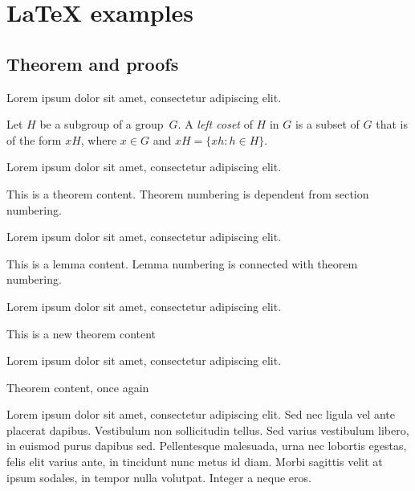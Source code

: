 \chapter{LaTeX examples}

\section{Theorem and proofs}
Lorem ipsum dolor sit amet, consectetur adipiscing elit.

\begin{defi}
    Let $H$ be a subgroup of a group~$G$.  A \emph{left coset}
    of $H$ in $G$ is a subset of $G$ that is of the form $xH$,
    where $x \in G$ and $xH = \{ xh : h \in H \}$.
\end{defi}

Lorem ipsum dolor sit amet, consectetur adipiscing elit.

\begin{theorem}
    This is a theorem content. Theorem numbering is dependent from section numbering.
\end{theorem}

Lorem ipsum dolor sit amet, consectetur adipiscing elit.

\begin{lemma}
    This is a lemma content. Lemma numbering is connected with theorem numbering.
\end{lemma}

Lorem ipsum dolor sit amet, consectetur adipiscing elit.

\begin{theorem}
    This is a new theorem content
\end{theorem}

Lorem ipsum dolor sit amet, consectetur adipiscing elit.

\begin{theorem}
    Theorem content, once again
\end{theorem}

Lorem ipsum dolor sit amet, consectetur adipiscing elit. Sed nec ligula vel
ante placerat dapibus. Vestibulum non sollicitudin tellus. Sed varius
vestibulum libero, in euismod purus dapibus sed. Pellentesque malesuada, urna
nec lobortis egestas, felis elit varius ante, in tincidunt nunc metus id diam.
Morbi sagittis velit at ipsum sodales, in tempor nulla volutpat. Integer a
neque eros.


